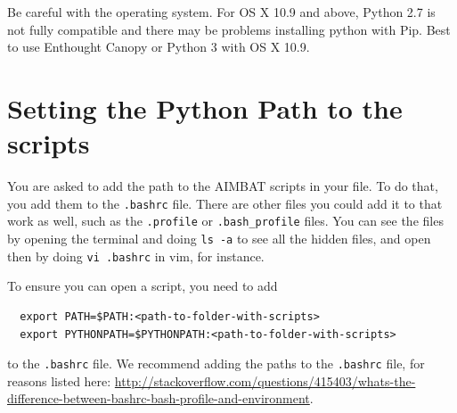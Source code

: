 \documentclass[letterpaper,10pt]{article}
\begin{document}
Be careful with the operating system. For OS X 10.9 and above, Python 2.7 is not fully compatible and there may be problems installing python with Pip. Best to use Enthought Canopy or Python 3 with OS X 10.9. 



\section{Setting the Python Path to the scripts}

You are asked to add the path to the AIMBAT scripts in your file. To do that, you add them to the \verb".bashrc" file. There are other files you could add it to that work as well, such as the \verb".profile" or \verb".bash_profile" files. You can see the files by opening the terminal and doing \verb"ls -a" to see all the hidden files, and open then by doing \verb"vi .bashrc" in vim, for instance.

To ensure you can open a script, you need to add
\begin{verbatim}
  export PATH=$PATH:<path-to-folder-with-scripts>
  export PYTHONPATH=$PYTHONPATH:<path-to-folder-with-scripts>
\end{verbatim}
to the \verb".bashrc" file. We recommend adding the paths to the \verb".bashrc" file, for reasons listed here: \url{http://stackoverflow.com/questions/415403/whats-the-difference-between-bashrc-bash-profile-and-environment}.



\end{document}
